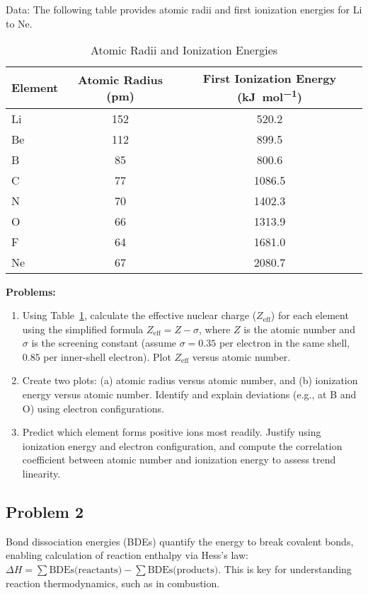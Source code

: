 \documentclass[12pt]{article}
\begin{document}
Data: The following table provides atomic radii and first ionization energies for Li to Ne.

\begin{table}[h]
\centering
\caption{Atomic Radii and Ionization Energies}
\label{tab:q1_data}
\begin{tabular}{lcc}
\toprule
Element & Atomic Radius (\si{\pico\meter}) & First Ionization Energy (\si{\kilo\joule\per\mole}) \\
\midrule
Li & 152 & 520.2 \\
Be & 112 & 899.5 \\
B  & 85  & 800.6 \\
C  & 77  & 1086.5 \\
N  & 70  & 1402.3 \\
O  & 66  & 1313.9 \\
F  & 64  & 1681.0 \\
Ne & 67  & 2080.7 \\
\bottomrule
\end{tabular}
\end{table}

\textbf{Problems:}

\begin{enumerate}
\item Using Table~\ref{tab:q1_data}, calculate the effective nuclear charge ($Z_{\text{eff}}$) for each element using the simplified formula $Z_{\text{eff}} = Z - \sigma$, where $Z$ is the atomic number and $\sigma$ is the screening constant (assume $\sigma = 0.35$ per electron in the same shell, $0.85$ per inner-shell electron). Plot $Z_{\text{eff}}$ versus atomic number.

\item Create two plots: (a) atomic radius versus atomic number, and (b) ionization energy versus atomic number. Identify and explain deviations (e.g., at B and O) using electron configurations.

\item Predict which element forms positive ions most readily. Justify using ionization energy and electron configuration, and compute the correlation coefficient between atomic number and ionization energy to assess trend linearity.
\end{enumerate}

\subsection{Problem 2}
Bond dissociation energies (BDEs) quantify the energy to break covalent bonds, enabling calculation of reaction enthalpy via Hess’s law: $\Delta H = \sum \text{BDEs(reactants)} - \sum \text{BDEs(products)}$. This is key for understanding reaction thermodynamics, such as in combustion.
\end{document}
